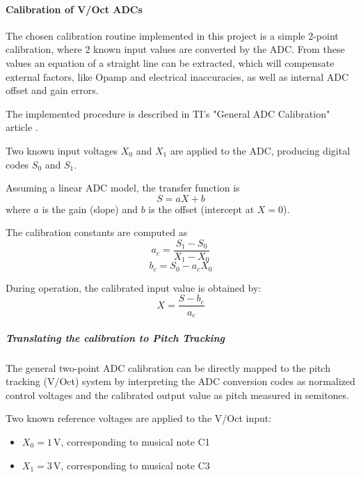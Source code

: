 \paragraph{Calibration of V/Oct ADCs}
\label{sec:calibration-and-pitch-tracking}

The chosen calibration routine implemented in this project is a simple 2-point calibration, where 2 known input values are converted by the ADC. 
From these values an equation of a straight line can be extracted, which will compensate external factors, like Opamp and electrical inaccuracies, as well as internal ADC offset and gain errors. 

The implemented procedure is described in TI's "General ADC Calibration" article \cite{texasinstrumentsGeneralADCCalibration}.

Two known input voltages \( X_0 \) and \( X_1 \) are applied to the ADC, producing digital codes
\( S_0 \) and \( S_1 \).

Assuming a linear ADC model, the transfer function is
\begin{equation}
S = a X + b
\end{equation}
where \( a \) is the gain (slope) and \( b \) is the offset (intercept at \( X = 0 \)).

The calibration constants are computed as
\begin{equation}
a_c = \frac{S_1 - S_0}{X_1 - X_0}
\end{equation}
\begin{equation}
b_c = S_0 - a_c X_0
\end{equation}

During operation, the calibrated input value is obtained by:
\begin{equation}
X = \frac{S - b_c}{a_c}
\end{equation}

\subparagraph{Translating the calibration to Pitch Tracking}

The general two-point ADC calibration can be directly mapped to the pitch tracking
(V/Oct) system by interpreting the ADC conversion codes as normalized control voltages
and the calibrated output value as pitch measured in semitones.

Two known reference voltages are applied to the V/Oct input:
\begin{itemize}
	\item \( X_0 = 1\,\mathrm{V} \), corresponding to musical note C1
	\item \( X_1 = 3\,\mathrm{V} \), corresponding to musical note C3
\end{itemize}

